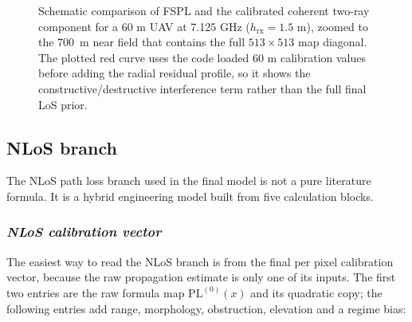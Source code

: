 \begin{figure}[H]
\centering
{}
\caption[FSPL versus coherent two-ray component.]%
{Schematic comparison of FSPL and the calibrated coherent two-ray component for
a 60 m UAV at 7.125 GHz ($h_{\mathrm{rx}} = 1.5$ m), zoomed to the
\SI{700}{m} near field that contains the full \(513\times513\) map diagonal.
The plotted red curve uses the code loaded 60 m calibration values before
adding the radial residual profile, so it shows the constructive/destructive
interference term rather than the full final LoS prior.}
\label{fig:tworay_pl}
\end{figure}

\subsection{NLoS branch}
\label{sec:nlos_branch}

The NLoS path loss branch used in the final model is not a pure literature
formula. It is a hybrid engineering model built from five calculation blocks.

\subsubsection{\texorpdfstring{\textit{NLoS calibration vector}}{NLoS calibration vector}}

The easiest way to read the NLoS branch is from the final per pixel calibration
vector, because the raw propagation estimate is only one of its inputs. The
first two entries are the raw formula map \(\mathrm{PL}^{(0)}(x)\) and its
quadratic copy; the following entries add range, morphology, obstruction,
elevation and a regime bias:

